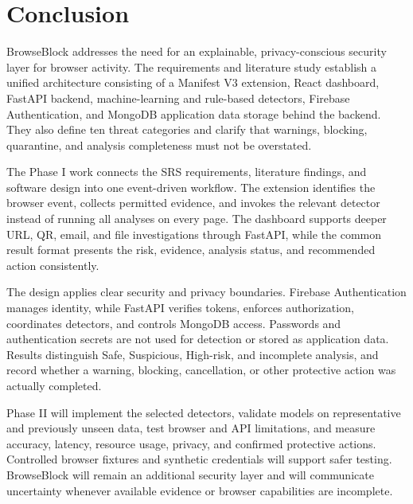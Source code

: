 \chapter{Conclusion}
\thispagestyle{fancy}

BrowseBlock addresses the need for an explainable, privacy-conscious security layer
for browser activity. The requirements and literature study establish a unified
architecture consisting of a Manifest V3 extension, React dashboard, FastAPI backend,
machine-learning and rule-based detectors, Firebase Authentication, and MongoDB
application data storage behind the backend.
They also define ten threat categories and clarify that warnings, blocking, quarantine,
and analysis completeness must not be overstated.

The Phase I work connects the SRS requirements, literature findings, and software
design into one event-driven workflow. The extension identifies the browser event,
collects permitted evidence, and invokes the relevant detector instead of running
all analyses on every page. The dashboard supports deeper URL, QR, email, and file
investigations through FastAPI, while the common result format presents the risk,
evidence, analysis status, and recommended action consistently.

The design applies clear security and privacy boundaries. Firebase Authentication
manages identity, while FastAPI verifies tokens, enforces authorization, coordinates
detectors, and controls MongoDB access. Passwords and authentication secrets are
not used for detection or stored as application data. Results distinguish Safe,
Suspicious, High-risk, and incomplete analysis, and record whether a warning,
blocking, cancellation, or other protective action was actually completed.

Phase II will implement the selected detectors, validate models on representative
and previously unseen data, test browser and API limitations, and measure accuracy,
latency, resource usage, privacy, and confirmed protective actions. Controlled
browser fixtures and synthetic credentials will support safer testing. BrowseBlock
will remain an additional security layer and will communicate uncertainty whenever
available evidence or browser capabilities are incomplete.
